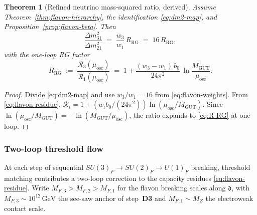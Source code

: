 \documentclass[11pt]{article}
\theoremstyle{plain}
\newtheorem{theorem}{Theorem}[section]
\theoremstyle{definition}
\theoremstyle{remark}
\numberwithin{equation}{section}
\begin{document}
\begin{theorem}[Refined neutrino mass-squared ratio, derived]
\label{thm:nu-ratio-rg}
Assume Theorem~\ref{thm:flavon-hierarchy}, the identification \eqref{eq:dm2-map},
and Proposition~\ref{prop:flavon-beta}. Then
\begin{equation}\label{eq:nu-ratio-refined}
  \frac{\Delta m^2_{31}}{\Delta m^2_{21}}
  \;=\;
  \frac{w_3}{w_1}\,R_{\mathrm{RG}}
  \;=\;
  16\,R_{\mathrm{RG}},
\end{equation}
with the one-loop RG factor
\begin{equation}\label{eq:R-RG}
  R_{\mathrm{RG}}
  \;:=\;
  \frac{\mathcal{R}_3(\mu_{\mathrm{osc}})}{\mathcal{R}_1(\mu_{\mathrm{osc}})}
  \;=\;
  1 + \frac{(w_3-w_1)\,b_0}{24\pi^2}\,
  \ln\!\frac{M_{\mathrm{GUT}}}{\mu_{\mathrm{osc}}}.
\end{equation}
\end{theorem}

\begin{proof}
Divide \eqref{eq:dm2-map} and use $w_3/w_1=16$ from \eqref{eq:flavon-weights}.
From \eqref{eq:flavon-residue},
$\mathcal{R}_\iota=1+(w_\iota b_0/(24\pi^2))\ln(\mu_{\mathrm{osc}}/M_{\mathrm{GUT}})$.
Since $\ln(\mu_{\mathrm{osc}}/M_{\mathrm{GUT}})=
-\ln(M_{\mathrm{GUT}}/\mu_{\mathrm{osc}})$, the ratio expands to
\eqref{eq:R-RG} at one loop.
\end{proof}

\subsubsection{Two-loop threshold flow}

At each step of sequential $SU(3)_F\to SU(2)_F\to U(1)_F$ breaking,
threshold matching contributes a two-loop correction to the capacity
residues \eqref{eq:flavon-residue}. Write $M_{F,3}>M_{F,2}>M_{F,1}$ for
the flavon breaking scales along $\mathfrak{d}$, with
$M_{F,3}\sim 10^{12}\,\mathrm{GeV}$ the see-saw anchor of step~\textbf{D3}
and $M_{F,1}\sim M_Z$ the electroweak contact scale.
\end{document}

